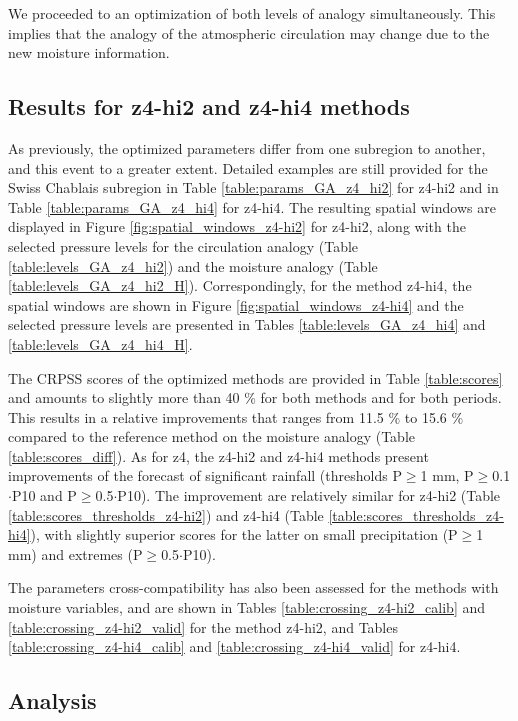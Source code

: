 \documentclass{ametsoc}
\begin{document}
We proceeded to an optimization of both levels of analogy simultaneously. This implies that the analogy of the atmospheric circulation may change due to the new moisture information.


\subsection{Results for z4-hi2 and z4-hi4 methods}

As previously, the optimized parameters differ from one subregion to another, and this event to a greater extent. Detailed examples are still provided for the Swiss Chablais subregion in Table \ref{table:params_GA_z4_hi2} for z4-hi2 and in Table \ref{table:params_GA_z4_hi4} for z4-hi4. The resulting spatial windows are displayed in Figure \ref{fig:spatial_windows_z4-hi2} for z4-hi2, along with the selected pressure levels for the circulation analogy (Table \ref{table:levels_GA_z4_hi2}) and the moisture analogy (Table \ref{table:levels_GA_z4_hi2_H}). Correspondingly, for the method z4-hi4, the spatial windows are shown in Figure \ref{fig:spatial_windows_z4-hi4} and the selected pressure levels are presented in Tables \ref{table:levels_GA_z4_hi4} and \ref{table:levels_GA_z4_hi4_H}.

The CRPSS scores of the optimized methods are provided in Table \ref{table:scores} and amounts to slightly more than 40 \% for both methods and for both periods. This results in a relative improvements that ranges from 11.5 \% to 15.6 \% compared to the reference method on the moisture analogy (Table \ref{table:scores_diff}). As for z4, the z4-hi2 and z4-hi4 methods present improvements of the forecast of significant rainfall (thresholds P\(\geq\)1 mm, P\(\geq\)0.1\(\cdot\)P10 and P\(\geq\)0.5\(\cdot\)P10). The improvement are relatively similar for z4-hi2 (Table \ref{table:scores_thresholds_z4-hi2}) and z4-hi4 (Table \ref{table:scores_thresholds_z4-hi4}), with slightly superior scores for the latter on small precipitation (P\(\geq\)1 mm) and extremes (P\(\geq\)0.5\(\cdot\)P10).

The parameters cross-compatibility has also been assessed for the methods with moisture variables, and are shown in Tables \ref{table:crossing_z4-hi2_calib} and \ref{table:crossing_z4-hi2_valid} for the method z4-hi2, and Tables \ref{table:crossing_z4-hi4_calib} and \ref{table:crossing_z4-hi4_valid} for z4-hi4.


\subsection{Analysis}
\end{document}
